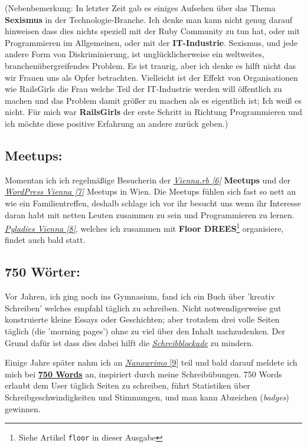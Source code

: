(Nebenbemerkung: In letzter Zeit gab es einiges Aufsehen über das Thema \textbf{Sexismus} in der Technologie-Branche. Ich denke man kann nicht genug darauf hinweisen dass dies nichts speziell mit der Ruby Community zu tun hat, oder mit Programmieren im Allgemeinen, oder mit der \textbf{IT-Industrie}. Sexismus, und jede andere Form von Diskriminierung, ist unglücklicherweise ein weltweites, branchenübergreifendes Problem. Es ist traurig, aber ich denke es hilft nicht das wir Frauen uns als Opfer betrachten. Vielleicht ist der Effekt von Organisationen wie RailsGirls die Frau welche Teil der IT-Industrie werden will öffentlich zu machen und das Problem damit größer zu machen als es eigentlich ist; Ich weiß es nicht. Für mich war \textbf{RailsGirls} der erste Schritt in Richtung Programmieren und ich möchte diese positive Erfahrung an andere zurück geben.)

\subsection*{Meetups:}

Momentan ich ich regelmäßige Besucherin der \href{http://vienna.rb}{\textit{Vienna.rb [6]}} \textbf{Meetups} und der \href{http://wpvienna.com/}{\textit{WordPress Vienna [7]}} Meetups in Wien. Die Meetups fühlen sich fast so nett an wie ein Familientreffen, deshalb schlage ich vor ihr besucht uns wenn ihr Interesse daran habt mit netten Leuten zusammen zu sein und Programmieren zu lernen. \href{http://meetup.com/pyladies-vienna}{\textit{Pyladies Vienna [8]}}, welches ich zusammen mit \textbf{Floor DREES}\footnote{Siehe Artikel \texttt{floor} in dieser Ausgabe} organisiere, findet auch bald statt. 

\subsection*{750 Wörter:}

Vor Jahren, ich ging noch ins Gymnasium, fand ich ein Buch über 'kreativ Schreiben' welches empfahl täglich zu schreiben. Nicht notwendigerweise gut konstruierte kleine Essays oder Geschichten; aber trotzdem drei volle Seiten täglich (die 'morning pages') ohne zu viel über den Inhalt nachzudenken. Der Grund dafür ist dass dies dabei hilft die \href{https://de.wikipedia.org/wiki/Schreibblockade}{\textit{Schreibblockade}} zu mindern. 

Einige Jahre später nahm ich an \href{http://nanowrimo.org/}{\textit{Nanowrimo} [9]} teil und bald darauf meldete ich mich bei \href{https://750words.com/}{\textbf{750 Words}} an, inspiriert durch meine Schreibübungen. 750 Words erlaubt dem User täglich Seiten zu schreiben, führt Statistiken über Schreibgeschwindigkeiten und Stimmungen, und man kann Abzeichen (\textit{badges}) gewinnen. 

